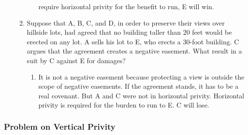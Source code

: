 \begin{enumerate}
\begin{enumerate}
\begin{enumerate}
            require horizontal privity for the benefit to run, E will win.
        \end{enumerate}
        \item Suppose that A, B, C, and D, in order to preserve their views 
        over hillside lots, had agreed that no building taller than 20 feet 
        would be erected on any lot. A sells his lot to E, who erects a 
        30-foot building. C argues that the agreement creates a negative 
        easement. What result in a suit by C against E for damages?    
        \begin{enumerate}
            \item It is not a negative easement because protecting a view is 
            outside the scope of negative easements. If the agreement stands, 
            it has to be a real covenant. But A and C were not in horizontal 
            privity. Horizontal privity is required for the burden to run to 
            E. C will lose.
        \end{enumerate}
    \end{enumerate}
\end{enumerate}

\subsubsection{Problem on Vertical Privity}

